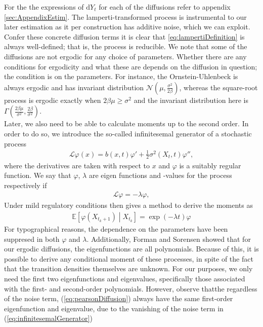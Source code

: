 For the the expressions of $\mathrm{d}Y_t$ for each of the diffusions refer to appendix \ref{sec:AppendixEstim}. The lamperti-transformed process is instrumental to our later estimation as it per construction has additive noise, which we can exploit. Confer these concrete diffusion terms it is clear that \ref{eq:lampertiDefinition} is always well-defined; that is, the process is reducible.  We note that some of the diffusions are not ergodic for any choice of parameters. Whether there are any conditions for ergodicity and what these are depends on the diffusion in question; the condition is on the parameters. For instance, the Ornstein-Uhlenbeck is always ergodic and has invariant distribution $\mathcal{N}\left(\mu, \frac{\sigma^2}{2\beta}\right)$, whereas the square-root process is ergodic exactly when $2\beta\mu\geq \sigma^2$ and the invariant distribution here is $\Gamma\left(\frac{2\beta\mu}{\sigma^2}, \frac{2\beta}{\sigma^2}\right)$. \\

Later, we also need to be able to calculate moments up to the second order. In order to do so, we introduce the so-called infinitesemal generator of a stochastic process
\begin{align}
    \mathcal{L}\varphi(x) = b(x, t) \varphi' + \frac{1}{2}\sigma^2(X_t, t)\varphi'', \label{eq:infinitesemalGenerator}
\end{align}
where the derivatives are taken with respect to $x$ and $\varphi$ is a suitably regular function. We say that $\varphi$, $\lambda$ are eigen functions and -values for the process respectively if
\begin{align}
    \mathcal{L}\varphi = - \lambda \varphi,
\end{align}
Under mild regulatory conditions \cite[theorem 1.16]{StatisticalMethodsForSDE} then gives a method to derive the moments as
\begin{align}
    \mathbb{E}\left[\varphi(X_{t_k + 1}) \middle | X_{t_k}\right] = \exp\left(-\lambda t\right)\varphi \label{eq:momentConditions}
\end{align}
For typographical reasons, the dependence on the parameters have been suppresed in both $\varphi$ and $\lambda$. Additionally, Forman and Sorensen \cite{FormanSorensen2008} showed that for our ergodic diffusions, the eigenfunctions are all polynomials. Because of this, it is possible to derive any conditional moment of these processes, in spite of the fact that  the transition densities themselves are unknown. For our purposes, we only need the first two eigenfunctions and eigenvalues, specifically those associated with the first- and second-order polynomials. However, observe thatthe regardless of the noise term, (\ref{eq:pearsonDiffusion}) always have the same first-order eigenfunction and eigenvalue,  due to the vanishing of the noise term in (\ref{eq:infinitesemalGenerator}) 
